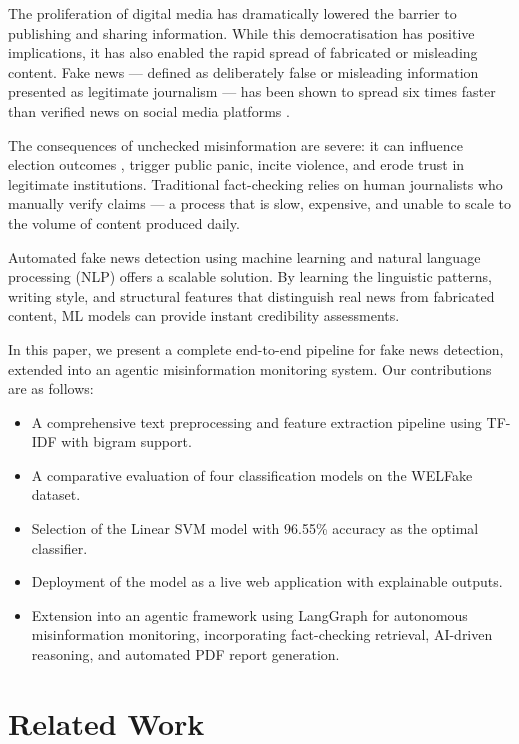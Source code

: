 \documentclass[conference]{IEEEtran}
\begin{document}
The proliferation of digital media has dramatically lowered the barrier to publishing and sharing information. While this democratisation has positive implications, it has also enabled the rapid spread of fabricated or misleading content. Fake news — defined as deliberately false or misleading information presented as legitimate journalism — has been shown to spread six times faster than verified news on social media platforms \cite{vosoughi2018spread}.

The consequences of unchecked misinformation are severe: it can influence election outcomes \cite{allcott2017social}, trigger public panic, incite violence, and erode trust in legitimate institutions. Traditional fact-checking relies on human journalists who manually verify claims — a process that is slow, expensive, and unable to scale to the volume of content produced daily.

Automated fake news detection using machine learning and natural language processing (NLP) offers a scalable solution. By learning the linguistic patterns, writing style, and structural features that distinguish real news from fabricated content, ML models can provide instant credibility assessments.

In this paper, we present a complete end-to-end pipeline for fake news detection, extended into an agentic misinformation monitoring system. Our contributions are as follows:

\begin{itemize}
    \item A comprehensive text preprocessing and feature extraction pipeline using TF-IDF with bigram support.
    \item A comparative evaluation of four classification models on the WELFake dataset.
    \item Selection of the Linear SVM model with 96.55\% accuracy as the optimal classifier.
    \item Deployment of the model as a live web application with explainable outputs.
    \item Extension into an agentic framework using LangGraph for autonomous misinformation monitoring, incorporating fact-checking retrieval, AI-driven reasoning, and automated PDF report generation.
\end{itemize}

\section{Related Work}
\end{document}
